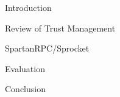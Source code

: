 \centerline{}
\stopslide


\begin{cenumerate}
\item Introduction
\item Review of Trust Management
\item SpartanRPC/Sprocket
\item {}
\item Evaluation
\item Conclusion
\end{cenumerate}
\stopslide


